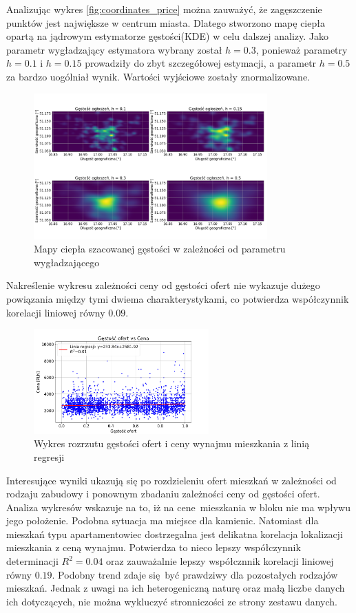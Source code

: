 \documentclass[10pt]{article}
\begin{document}
Analizując wykres \ref{fig:coordinates_price} można zauważyć, że zagęszczenie punktów jest największe w centrum miasta. 
Dlatego stworzono mapę ciepła opartą na jądrowym estymatorze gęstości(KDE) w celu dalszej analizy.
Jako parametr wygładzający estymatora wybrany został $ h = 0.3 $, ponieważ parametry $ h = 0.1 $ i $ h = 0.15 $ prowadziły do zbyt szczegółowej estymacji, 
a parametr $ h = 0.5 $ za bardzo uogólniał wynik.
Wartości wyjściowe zostały znormalizowane.
\begin{figure}[H]
    \centering
    \includegraphics[width=0.8\textwidth]{kde-heatmap.png}
    \caption{Mapy ciepła szacowanej gęstości w zależności od parametru wygładzającego}
    \label{fig:kde_heatmap}
\end{figure}

Nakreślenie wykresu zależności ceny od gęstości ofert nie wykazuje dużego powiązania między tymi dwiema charakterystykami, co potwierdza współczynnik korelacji liniowej równy $ 0.09 $.

\begin{figure}[H]
    \centering
    \includegraphics[width=0.6\textwidth]{density-price.png}
    \caption{Wykres rozrzutu gęstości ofert i ceny wynajmu mieszkania z linią regresji}
    \label{fig:density_price}
\end{figure}


Interesujące wyniki ukazują się po rozdzieleniu ofert mieszkań w zależności od rodzaju zabudowy i ponownym zbadaniu zależności ceny od gęstości ofert.
Analiza wykresów wskazuje na to, iż na cene mieszkania w bloku nie ma wpływu jego położenie. Podobna sytuacja ma miejsce dla kamienic.
Natomiast dla mieszkań typu apartamentowiec dostrzegalna jest delikatna korelacja lokalizacji mieszkania z ceną wynajmu.
Potwierdza to nieco lepszy współczynnik determinacji $ R^2 = 0.04 $ oraz zauważalnie lepszy współcznnik korelacji liniowej równy $ 0.19 $.
Podobny trend zdaje się być prawdziwy dla pozostałych rodzajów mieszkań. 
Jednak z uwagi na ich heterogeniczną naturę oraz małą liczbe danych ich dotyczących, nie można wykluczyć stronniczości ze strony zestawu danych.
\end{document}
